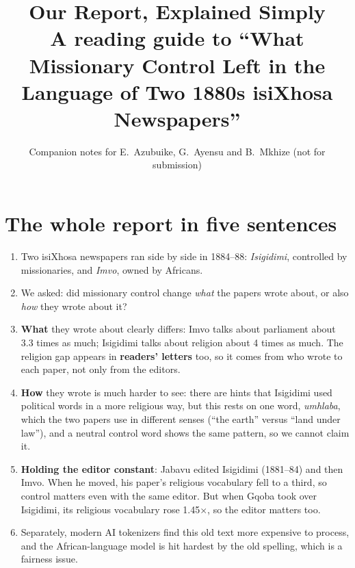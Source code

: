 \documentclass[11pt]{article}
\title{Our Report, Explained Simply\\\large A reading guide to ``What Missionary Control Left in the Language of Two 1880s isiXhosa Newspapers''}
\author{Companion notes for E.~Azubuike, G.~Ayensu and B.~Mkhize (not for submission)}
\date{}
\newcommand{\key}[1]{\textbf{#1}}
\begin{document}
\maketitle
\tableofcontents
\bigskip

\section{The whole report in five sentences}
\begin{enumerate}
\item Two isiXhosa newspapers ran side by side in 1884--88: \emph{Isigidimi}, controlled by missionaries, and \emph{Imvo}, owned by Africans.
\item We asked: did missionary control change \emph{what} the papers wrote about, or also \emph{how} they wrote about it?
\item \key{What} they wrote about clearly differs: Imvo talks about parliament about 3.3 times as much; Isigidimi talks about religion about 4 times as much. The religion gap appears in \key{readers' letters} too, so it comes from who wrote to each paper, not only from the editors.
\item \key{How} they wrote is much harder to see: there are hints that Isigidimi used political words in a more religious way, but this rests on one word, \emph{umhlaba}, which the two papers use in different senses (``the earth'' versus ``land under law''), and a neutral control word shows the same pattern, so we cannot claim it.
\item \key{Holding the editor constant}: Jabavu edited Isigidimi (1881--84) and then Imvo. When he moved, his paper's religious vocabulary fell to a third, so control matters even with the same editor. But when Gqoba took over Isigidimi, its religious vocabulary rose 1.45$\times$, so the editor matters too.
\item Separately, modern AI tokenizers find this old text more expensive to process, and the African-language model is hit hardest by the old spelling, which is a fairness issue.
\end{enumerate}
\end{document}
